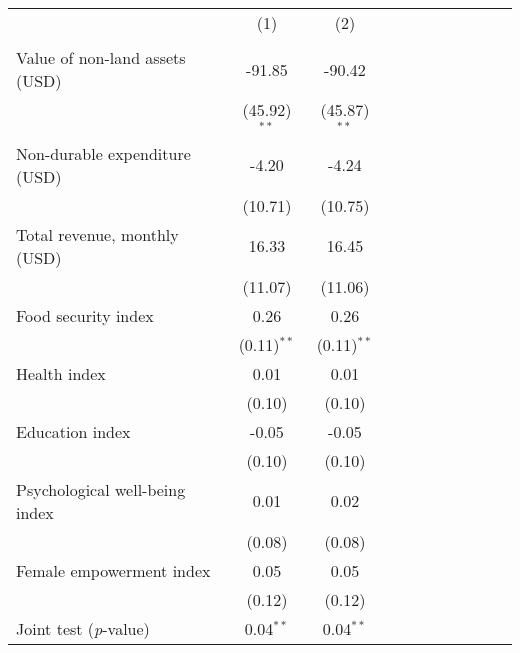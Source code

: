 {
\def\sym#1{\ifmmode^{#1}\else\(^{#1}\)\fi}
\begin{tabular}{l*{2}{SSSSS}}
\toprule
          &&\\
          &&\\
\midrule
Value of non-land assets (USD)&   -91.85&   -90.42\\
          &(45.92)$^{**}$&(45.87)$^{**}$\\
Non-durable expenditure (USD)&    -4.20&    -4.24\\
          &  (10.71)&  (10.75)\\
Total revenue, monthly (USD)&    16.33&    16.45\\
          &  (11.07)&  (11.06)\\
Food security index&     0.26&     0.26\\
          &(0.11)$^{**}$&(0.11)$^{**}$\\
Health index&     0.01&     0.01\\
          &   (0.10)&   (0.10)\\
Education index&    -0.05&    -0.05\\
          &   (0.10)&   (0.10)\\
Psychological well-being index&     0.01&     0.02\\
          &   (0.08)&   (0.08)\\
Female empowerment index&     0.05&     0.05\\
          &   (0.12)&   (0.12)\\
\midrule Joint test (\emph{p}-value)&0.04$^{**}$&0.04$^{**}$\\
\bottomrule
\end{tabular}
}
